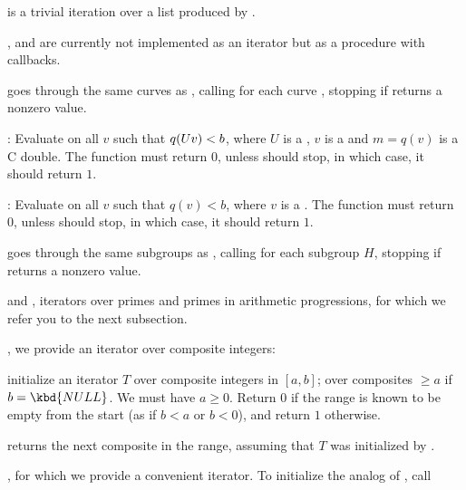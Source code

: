 \item {} is a trivial iteration over a list produced by
.

\item {},  and  are currently not
implemented as an iterator but as a procedure with callbacks.

goes through the same curves as , calling
 for each curve , stopping if  returns a
nonzero value.

:
Evaluate  on all $v$ such that $q(U\*v)<b$, where $U$ is a
, $v$ is a  and $m=q(v)$ is a C double. The function
 must return $0$, unless  should stop, in which case,
it should return $1$.

:
Evaluate  on all $v$ such that $q(v)<b$, where $v$ is a
. The function  must return $0$, unless 
should stop, in which case, it should return $1$.

goes through the same subgroups as , calling
 for each subgroup $H$, stopping if  returns a
nonzero value.

\item {} and , iterators over primes and
primes in arithmetic progressions, for which we refer you to the
next subsection.

\item {}, we provide an iterator over composite integers:

 initialize an
iterator $T$ over composite integers in $[a,b]$; over composites $\geq a$ if
$b = \kbd{NULL}$. We must have $a\geq 0$. Return $0$ if the range is known to
be empty from the start (as if $b < a$ or $b < 0$), and return $1$ otherwise.

 returns the next composite in
the range, assuming that $T$ was initialized by .

\item {}, for which we provide a convenient iterator. To
initialize the analog of , call

